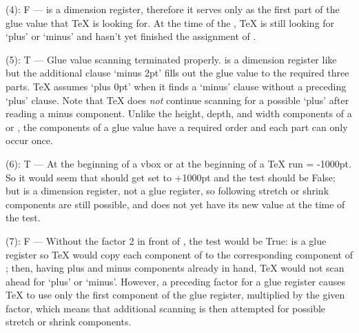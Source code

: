 \begin{lcode}
\end{lcode}
(4): F --- \cmd{\z@} is a dimension register, therefore it serves only as the
first part of the glue value that TeX is looking for. At the time of the
, TeX is still looking for `plus' or `minus' and hasn't yet
finished the assignment of \cmd{\tabskip}.

\begin{lcode}
\end{lcode}
(5): T --- Glue value scanning terminated properly. \cmd{\p@} is a dimension
register like \cmd{\z@} but the additional clause `minus 2pt' fills out the
glue value to the required three parts.  TeX assumes `plus 0pt' when it
finds a `minus' clause without a preceding `plus' clause. Note that TeX
does \emph{not} continue scanning for a possible `plus' after reading a minus
component. Unlike the height, depth, and width components of a \cmd{\vrule} or
\cmd{\hrule}, the components of a glue value have a required order and each
part can only occur once.

\begin{lcode}
\end{lcode}
(6): T --- At the beginning of a vbox or at the beginning of a TeX run
\cmd{\prevdepth} = -1000pt. So it would seem that \cmd{\baselineskip} should get set
to +1000pt and the test should be False; but \cmd{\prevdepth} is a dimension
register, not a glue register, so following stretch or shrink components
are still possible, and \cmd{\baselineskip} does not yet have its new value at
the time of the test.

\begin{lcode}
\end{lcode}
(7): F --- Without the factor 2 in front of \cmd{\topskip}, the test would
be True: \cmd{\topskip} is a glue register so TeX would copy each component of
\cmd{\topskip} to the corresponding component of \cmd{\baselineskip}; then, having plus
and minus components already in hand, TeX would not scan ahead for
`plus' or `minus'. However, a preceding factor for a glue register
causes TeX to use only the first component of the glue register,
multiplied by the given factor, which means that additional scanning is
then attempted for possible stretch or shrink components.


